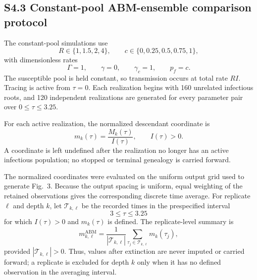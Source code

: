 \documentclass[9pt,a4paper]{article}
\newcommand{\ABM}{\mathrm{ABM}}
\begin{document}
\subsection*{S4.3 Constant-pool ABM-ensemble comparison protocol}

The constant-pool simulations use
\begin{equation}
R\in\{1,1.5,2,4\},\qquad c\in\{0,0.25,0.5,0.75,1\},
\tag{S4.14}
\end{equation}
with dimensionless rates
\begin{equation}
\Gamma=1,\qquad \gamma=0,\qquad \gamma_c=1,\qquad p_f=c.
\tag{S4.15}
\end{equation}
The susceptible pool is held constant, so transmission occurs at total rate $RI$. Tracing is active from $\tau=0$. Each realization begins with 160 unrelated infectious roots, and 120 independent realizations are generated for every parameter pair over $0\leq\tau\leq3.25$.

For each active realization, the normalized descendant coordinate is
\begin{equation}
m_k(\tau)=\frac{M_k(\tau)}{I(\tau)},\qquad I(\tau)>0.
\tag{S4.16}
\end{equation}
A coordinate is left undefined after the realization no longer has an active infectious population; no stopped or terminal genealogy is carried forward.

The normalized coordinates were evaluated on the uniform output grid used to generate Fig.~3. Because the output spacing is uniform, equal weighting of the retained observations gives the corresponding discrete time average. For replicate $\ell$ and depth $k$, let $\mathcal T_{k,\ell}$ be the recorded times in the prespecified interval
\begin{equation}
3\leq\tau\leq3.25
\tag{S4.17}
\end{equation}
for which $I(\tau)>0$ and $m_k(\tau)$ is defined. The replicate-level summary is
\begin{equation}
m_{k,\ell}^{\ABM}=\frac{1}{|\mathcal T_{k,\ell}|}\sum_{\tau_j\in\mathcal T_{k,\ell}}m_k(\tau_j),
\tag{S4.18}
\end{equation}
provided $|\mathcal T_{k,\ell}|>0$. Thus, values after extinction are never imputed or carried forward; a replicate is excluded for depth $k$ only when it has no defined observation in the averaging interval.
\end{document}
